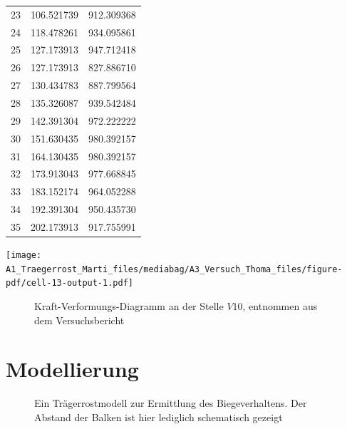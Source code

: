 \documentclass[
  11pt,
  letterpaper,
]{scrreprt}
\begin{document}
\begin{longtable}[]{@{}lll@{}}
23 & 106.521739 & 912.309368 \\
24 & 118.478261 & 934.095861 \\
25 & 127.173913 & 947.712418 \\
26 & 127.173913 & 827.886710 \\
27 & 130.434783 & 887.799564 \\
28 & 135.326087 & 939.542484 \\
29 & 142.391304 & 972.222222 \\
30 & 151.630435 & 980.392157 \\
31 & 164.130435 & 980.392157 \\
32 & 173.913043 & 977.668845 \\
33 & 183.152174 & 964.052288 \\
34 & 192.391304 & 950.435730 \\
35 & 202.173913 & 917.755991 \\
\end{longtable}

\texttt{[image: A1\_Traegerrost\_Marti\_files/mediabag/A3\_Versuch\_Thoma\_files/figure-pdf/cell-13-output-1.pdf]}

\begin{figure}[H]


\caption{\label{fig-tho_res_V10}Kraft-Verformungs-Diagramm an der Stelle
\(V10\), entnommen aus dem Versuchsbericht}

\end{figure}%

\section{Modellierung}\label{modellierung-2}

\begin{figure}[H]


\caption{\label{fig-tho_rost_iso}Ein Trägerrostmodell zur Ermittlung des
Biegeverhaltens. Der Abstand der Balken ist hier lediglich schematisch
gezeigt}

\end{figure}%
\end{document}

